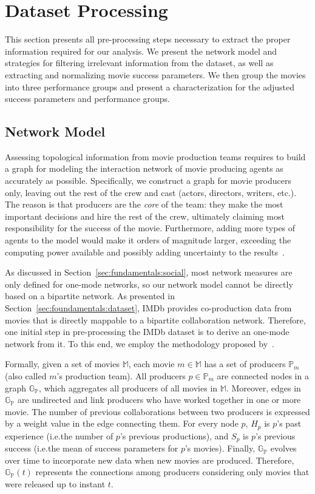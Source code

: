 \section{Dataset Processing}
\label{sec:dataset_interpret}
This section presents all pre-processing steps necessary to extract the proper
information required for our analysis. We present the network model and 
strategies for filtering irrelevant information from the dataset, as well as
extracting and normalizing movie success parameters. We then group the movies
into three performance groups and present a characterization for the adjusted
success parameters and performance groups.

\subsection{Network Model}
Assessing topological information from movie production teams requires to build
a graph for modeling the interaction network of movie producing agents as
accurately as possible. Specifically, we construct a graph for movie producers
only, leaving out the rest of the crew and cast (actors, directors, writers,
etc.). The reason is that producers are the \textit{core} of the team: they
make the most important decisions and hire the rest of the crew, ultimately
claiming most responsibility for the success of the movie.  Furthermore, adding
more types of agents to the model would make it orders of magnitude larger,
exceeding the computing power available and possibly adding uncertainty to the
results~\citep{COSN2014-cost1,elberse2007power,COSN2014-cost2}.

As discussed in Section~\ref{sec:fundamentals:social}, most
network measures are only defined for one-mode networks, so our network model
cannot be directly based on a bipartite network. As presented in
Section~\ref{sec:foundamentals:dataset}, IMDb provides co-production data from
movies that is directly mappable to a bipartite collaboration network.
Therefore, one initial step in pre-processing the IMDb dataset is to derive an
one-mode network from it. To this end, we employ the methodology proposed
by~\cite{newman2001scientific}.

Formally, given a set of movies $\mathbb{M}$, each movie $m \in \mathbb{M}$ has
a set of producers $\mathbb{P}_m$ (also called $m$'s production team). All
producers $p \in \mathbb{P}_m$ are connected nodes in a graph
$\mathbb{G}_\mathbb{P}$, which aggregates all producers of all movies in
$\mathbb{M}$. Moreover, edges in $\mathbb{G}_\mathbb{P}$ are undirected and
link producers who have worked together in one or more movie. The number of
previous collaborations between two producers is expressed by a weight value in
the edge connecting them. For every node $p$, $H_p$ is $p$'s past experience
(i.e.\@ the number of $p$'s previous productions), and $S_p$ is $p$'s previous
success (i.e.\@ the mean of success parameters for $p$'s movies). Finally,
$\mathbb{G}_\mathbb{P}$ evolves over time to incorporate new data when new
movies are produced. Therefore, $\mathbb{G}_\mathbb{P}(t)$ represents the
connections among producers considering only movies that were released up to
instant $t$.

